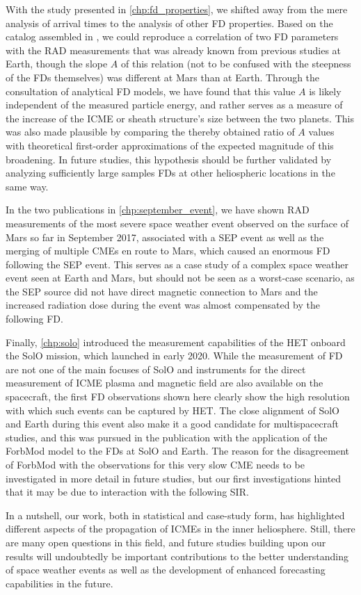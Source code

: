 With the study presented in \autoref{chp:fd_properties}, we shifted away from the mere analysis of arrival times to the analysis of other \ac{FD} properties. Based on the catalog assembled in \citet{Forstner-2019}, we could reproduce a correlation of two \ac{FD} parameters with the \ac{RAD} measurements that was already known from previous studies at Earth, though the slope $A$ of this relation (not to be confused with the steepness of the \acp{FD} themselves) was different at Mars than at Earth. Through the consultation of analytical \ac{FD} models, we have found that this value $A$ is likely independent of the measured particle energy, and rather serves as a measure of the increase of the \ac{ICME} or sheath structure's size between the two planets. This was also made plausible by comparing the thereby obtained ratio of $A$ values with theoretical first-order approximations of the expected magnitude of this broadening. In future studies, this hypothesis should be further validated by analyzing sufficiently large samples \acp{FD} at other heliospheric locations in the same way.

In the two publications in \autoref{chp:september_event}, we have shown \ac{RAD} measurements of the most severe space weather event observed on the surface of Mars so far in September 2017, associated with a \ac{SEP} event as well as the merging of multiple \acp{CME} en route to Mars, which caused an enormous \ac{FD} following the \ac{SEP} event. This serves as a case study of a complex space weather event seen at Earth and Mars, but should not be seen as a worst-case scenario, as the \ac{SEP} source did not have direct magnetic connection to Mars and the increased radiation dose during the event was almost compensated by the following \ac{FD}.

Finally, \autoref{chp:solo} introduced the measurement capabilities of the \ac{HET} onboard the \ac{SolO} mission, which launched in early 2020. While the measurement of \ac{FD} are not one of the main focuses of \ac{SolO} and instruments for the direct measurement of \ac{ICME} plasma and magnetic field are also available on the spacecraft, the first \ac{FD} observations shown here clearly show the high resolution with which such events can be captured by \ac{HET}. The close alignment of \ac{SolO} and Earth during this event also make it a good candidate for multispacecraft studies, and this was pursued in the publication with the application of the \acs{ForbMod} model to the \acp{FD} at \ac{SolO} and Earth. The reason for the disagreement of \acs{ForbMod} with the observations for this very slow \ac{CME} needs to be investigated in more detail in future studies, but our first investigations hinted that it may be due to interaction with the following \acl{SIR}.

In a nutshell, our work, both in statistical and case-study form, has highlighted different aspects of the propagation of \acp{ICME} in the inner heliosphere. Still, there are many open questions in this field, and future studies building upon our results will undoubtedly be important contributions to the better understanding of space weather events as well as the development of enhanced forecasting capabilities in the future.
